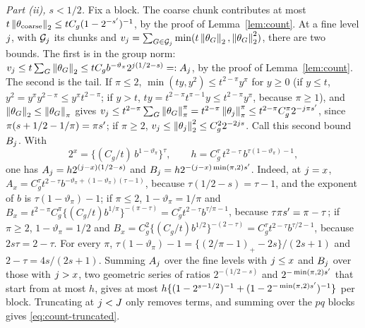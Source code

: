 \emph{Part (ii), $s < 1/2$.} Fix a block. The coarse chunk contributes at most
$t\left\lVert \theta_{\mathrm{coarse}} \right\rVert_{2} \le tC_g(1-2^{-s'})^{-1}$, by the
proof of Lemma~\ref{lem:count}. At a fine level $j$, with $\mathcal{G}_{j}$
its chunks and $v_{j} = \sum_{G\in\mathcal{G}_{j}}\min(t\left\lVert \theta_{G} \right\rVert_{2},
\left\lVert \theta_{G} \right\rVert_{2}^{2})$, there are two bounds. The first is in the group
norm: $v_{j} \le t\sum_{G}\left\lVert \theta_{G} \right\rVert_{2} \le
tC_gb^{-\vartheta_{\pi}}2^{j(1/2-s)} =: A_{j}$, by the proof of
Lemma~\ref{lem:count}. The second is the tail. If $\pi \le 2$,
$\min(ty,y^{2}) \le t^{2-\pi}y^{\pi}$ for $y \ge 0$ (if $y \le t$,
$y^{2} = y^{\pi}y^{2-\pi} \le y^{\pi}t^{2-\pi}$; if $y > t$,
$ty = t^{2-\pi}t^{\pi-1}y \le t^{2-\pi}y^{\pi}$, because $\pi \ge 1$), and
$\left\lVert \theta_{G} \right\rVert_{2} \le \left\lVert \theta_{G} \right\rVert_{\pi}$ gives
$v_{j} \le t^{2-\pi}\sum_{G}\left\lVert \theta_{G} \right\rVert_{\pi}^{\pi} =
t^{2-\pi}\left\lVert \theta_{j} \right\rVert_{\pi}^{\pi} \le
t^{2-\pi}C_g^{\pi}2^{-j\pi s'}$, since $\pi(s+1/2-1/\pi) = \pi s'$; if
$\pi \ge 2$, $v_{j} \le \left\lVert \theta_{j} \right\rVert_{2}^{2} \le C_g^{2}2^{-2j s}$.
Call this second bound $B_{j}$. With
\[
  2^{x} = \bigl\{(C_g/t)\,b^{1-\vartheta_{\pi}}\bigr\}^{\tau},
  \qquad
  h = C_g^{\tau}\,t^{2-\tau}\,b^{\tau(1-\vartheta_{\pi})-1},
\]
one has $A_{j} = h2^{(j-x)(1/2-s)}$ and
$B_{j} = h2^{-(j-x)\min(\pi,2)s'}$. Indeed, at $j = x$,
$A_{x} = C_g^{\tau}t^{2-\tau}b^{-\vartheta_{\pi}+(1-\vartheta_{\pi})(\tau-1)}$,
because $\tau(1/2-s) = \tau-1$, and the exponent of $b$ is
$\tau(1-\vartheta_{\pi})-1$; if $\pi \le 2$, $1-\vartheta_{\pi} = 1/\pi$ and
$B_{x} = t^{2-\pi}C_g^{\pi}\{(C_g/t)b^{1/\pi}\}^{-(\pi-\tau)} =
C_g^{\tau}t^{2-\tau}b^{\tau/\pi-1}$, because $\tau\pi s' = \pi-\tau$; if
$\pi \ge 2$, $1-\vartheta_{\pi} = 1/2$ and
$B_{x} = C_g^{2}\{(C_g/t)b^{1/2}\}^{-(2-\tau)} =
C_g^{\tau}t^{2-\tau}b^{\tau/2-1}$, because $2s\tau = 2-\tau$. For every $\pi$,
$\tau(1-\vartheta_{\pi})-1 = \{(2/\pi-1)_{+}-2s\}/(2s+1)$ and
$2-\tau = 4s/(2s+1)$. Summing $A_{j}$ over the fine levels with
$j \le x$ and $B_{j}$ over those with $j > x$, two geometric series
of ratios $2^{-(1/2-s)}$ and $2^{-\min(\pi,2)s'}$ that start from at most
$h$, gives at most $h\{(1-2^{s-1/2})^{-1} + (1-2^{-\min(\pi,2)s'})^{-1}\}$
per block. Truncating at $j < J$ only removes terms, and summing over the
$pq$ blocks gives \eqref{eq:count-truncated}.

